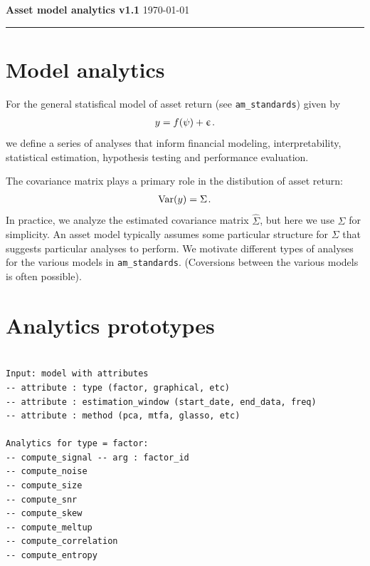 \documentclass[leqno,12pt]{article}
\begin{document}
\ifxetex
  \let\lsum\sum
  \renewcommand{\sum}{\bm{\lsum}}

  \let\lprod\prod
  \renewcommand{\prod}{\bm{\lprod}}
\else
\fi

\newcommand{\upep}{\upepsilon}
\newcommand{\mv}{\sigma_\rmM}
\newcommand{\mb}{\beta^{\rmM}}

{
\noindent
{\bf Asset model analytics v1.1}
\noindent
\hfill {\today} \noindent
\rule{\textwidth}{0.01in}


\section{Model analytics}

For the general statisfical model of asset return 
(see \verb|am_standards|) given by
\begin{align}
  y = f(\psi) + \upepsilon \hspace{1pt} .
\end{align}
we define a series of analyses that inform financial modeling,
interpretability, statistical estimation, hypothesis testing 
and performance evaluation.

The covariance matrix plays a primary role in the 
distibution of asset return:
\begin{align}
  \textup{Var}(y) = \Sigma \hspace{1pt} .
\end{align}
In practice, we analyze the estimated covariance matrix
$\hat{\Sigma}$, but here we use $\Sigma$ for simplicity.
An asset model typically assumes some particular structure
for $\Sigma$ that suggests particular analyses to perform.
We motivate different types of analyses for the various
models in \verb|am_standards|. (Coversions between the
various models is often possible).

\section{Analytics prototypes}

\begin{verbatim}
 
Input: model with attributes
-- attribute : type (factor, graphical, etc)
-- attribute : estimation_window (start_date, end_data, freq)
-- attribute : method (pca, mtfa, glasso, etc)

Analytics for type = factor:
-- compute_signal -- arg : factor_id 
-- compute_noise
-- compute_size
-- compute_snr
-- compute_skew
-- compute_meltup
-- compute_correlation
-- compute_entropy


\end{verbatim}}
\end{document}
